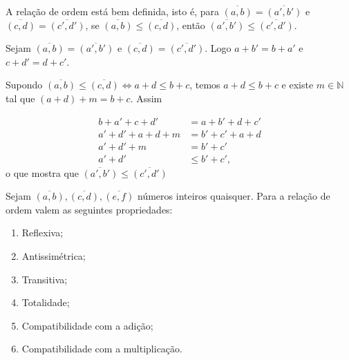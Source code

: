 \documentclass[../main.tex]{subfiles}
\begin{document}
\begin{teo}\label{int-teo-relacaoOrdemBemDefinida}
    A relação de ordem está bem definida, isto é, para $\overline{(a,b)} = \overline{(a',b')}$ e $\overline{(c,d)} = \overline{(c',d')}$, se $\overline{(a,b)} \leq \overline{(c,d)}$, então $\overline{(a',b')} \leq \overline{(c',d')}$.
\end{teo}
\begin{dem}

    Sejam $\overline{(a,b)} = \overline{(a',b')}$ e $\overline{(c,d)} = \overline{(c',d')}$. Logo $a+b' = b+a'$ e $c+d' = d+c'$.
   
    Supondo $\overline{(a,b)} \leq \overline{(c,d)} \iff a+d \leq b+c$, temos $a+d \leq b+c$ e existe $m \in \mathbb{N}$ tal que $(a+d)+m=b+c$. Assim
    
    \begin{align*}
        b+a'+c+d' &= a+b' + d+c' \\
        a'+d' + a+d + m &= b' + c' + a + d \\
        a'+d' + m &= b' + c'  \\
        a'+d' & \leq b'+c',
    \end{align*}
    o que mostra que $\overline{(a',b')}\leq\overline{(c',d')}$
     
\end{dem}
\begin{teo}{Sejam $\overline{(a,b)}, \overline{(c,d)}, \overline{(e,f)}$ números inteiros quaisquer. Para a relação de ordem valem as seguintes propriedades:}\label{int-teo-relacaoOrdemPropriedades}
    \begin{enumerate}[label=(\roman*)]
        \item Reflexiva;
        \item Antissimétrica;
        \item Transitiva;
        \item Totalidade;
        \item Compatibilidade com a adição;
        \item Compatibilidade com a multiplicação.
    \end{enumerate}
\end{teo}
\end{document}
